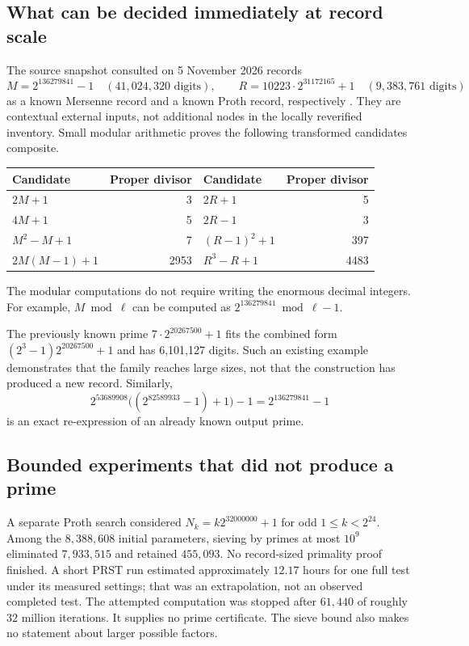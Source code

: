 \documentclass[11pt,a4paper]{article}
\theoremstyle{definition}\newtheorem{definition}[theorem]{Definition}
\theoremstyle{remark}\newtheorem{remark}[theorem]{Remark}
\begin{document}
\subsection{What can be decided immediately at record scale}

The source snapshot consulted on 5 November 2026 records
\[
 M=2^{136279841}-1\quad(41{,}024{,}320\text{ digits}),\qquad
 R=10223\cdot2^{31172165}+1\quad(9{,}383{,}761\text{ digits})
\]
as a known Mersenne record and a known Proth record, respectively
\cite{gimps,prothrecord}. They are contextual external inputs, not additional
nodes in the locally reverified inventory. Small modular arithmetic proves
the following transformed candidates composite.

\begin{center}
\begin{tabular}{@{}lrlr@{}}
\toprule
Candidate & Proper divisor & Candidate & Proper divisor\\
\midrule
$2M+1$ & 3 & $2R+1$ & 5\\
$4M+1$ & 5 & $2R-1$ & 3\\
$M^2-M+1$ & 7 & $(R-1)^2+1$ & 397\\
$2M(M-1)+1$ & 2953 & $R^3-R+1$ & 4483\\
\bottomrule
\end{tabular}
\end{center}
The modular computations do not require writing the enormous decimal
integers. For example, $M\bmod\ell$ can be computed as
$2^{136279841}\bmod\ell-1$.

The previously known prime $7\cdot2^{20267500}+1$ \cite{primelist} fits the combined form
$(2^3-1)2^{20267500}+1$ and has 6,101,127 digits. Such an existing example
demonstrates that the family reaches large sizes, not that the construction
has produced a new record. Similarly,
\[
 2^{53689908}\bigl((2^{82589933}-1)+1\bigr)-1
 =2^{136279841}-1
\]
is an exact re-expression of an already known output prime.

\subsection{Bounded experiments that did not produce a prime}

A separate Proth search considered
$N_k=k2^{32000000}+1$ for odd $1\le k<2^{24}$. Among the $8{,}388{,}608$
initial parameters, sieving by primes at most $10^9$ eliminated $7{,}933{,}515$
and retained $455{,}093$. No record-sized primality proof finished. A short
PRST \cite{prst} run estimated approximately $12.17$ hours for one full test under its
measured settings; that was an extrapolation, not an observed completed test.
The attempted computation was stopped after $61{,}440$ of roughly $32$ million
iterations. It supplies no prime certificate. The sieve bound also makes no
statement about larger possible factors.
\end{document}
